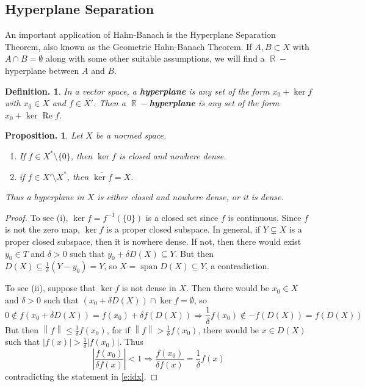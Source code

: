 \documentclass[11pt, a4paper]{memoir}
\DeclareMathOperator{\R}{{\mathbb{R}}}
\newcommand{\norm}[1]{\ensuremath{\left\lVert#1\right\rVert}}
\theoremstyle{change}
\newtheorem{proposition}[theorem]{Proposition.}
\theoremstyle{plain}
\theoremstyle{nonumberplain}
\newtheorem{definition}{Definition.}
\newtheorem{proof}{Proof}
\DeclareMathOperator{\spn}{span}
\renewcommand{\Re}{\ensuremath{\operatorname{Re}}}
\numberwithin{equation}{section}
\begin{document}
\subsection{Hyperplane Separation}
An important application of Hahn-Banach is the Hyperplane Separation Theorem, also known as the Geometric Hahn-Banach Theorem.
If $A,B\subset X$ with $A\cap B=\emptyset$ along with some other suitable assumptions, we will find a $\R-$hyperplane between $A$ and $B$.
\begin{definition}
    In a vector space, a \textbf{hyperplane} is any set of the form $x_0+\ker f$ with $x_0\in X$ and $f\in X'$.
    Then a \textbf{$\R-$hyperplane} is any set of the form $x_0+\ker\Re f$.
\end{definition}
\begin{proposition}
    Let $X$ be a normed space.
    \begin{enumerate}[nl,r]
        \item If $f\in X^*\setminus\{0\}$, then $\ker f$ is closed and nowhere dense.
        \item if $f\in X'\setminus X^*$, then $\overline{\ker f}=X$.
    \end{enumerate}
    Thus a hyperplane in $X$ is either closed and nowhere dense, or it is dense.
\end{proposition}
\begin{proof}
    To see (i), $\ker f=f^{-1}(\{0\})$ is a closed set since $f$ is continuous.
    Since $f$ is not the zero map, $\ker f$ is a proper closed subspace.
    In general, if $Y\subsetneq X$ is a proper closed subspace, then it is nowhere dense.
    If not, then there would exist $y_0\in T$ and $\delta>0$ such that $y_0+\delta D(X)\subseteq Y$.
    But then $D(X)\subseteq\frac{1}{\delta}(Y-y_0)=Y$, so $X=\spn D(X)\subseteq Y$, a contradiction.

    To see (ii), suppose that $\ker f$ is not dense in $X$.
    Then there would be $x_0\in X$ and $\delta>0$ such that $(x_0+\delta D(X))\cap \ker f=\emptyset$, so
    \begin{equation}\label{e:idx}
        0\notin f(x_0+\delta D(X))=f(x_0)+\delta f(D(X))\Longrightarrow \frac{1}{\delta}f(x_0)\notin -f(D(X))=f(D(X))
    \end{equation}
    But then $\norm{f}\leq\frac{1}{\delta}f(x_0)$, for if $\norm{f}>\frac{1}{\delta}f(x_0)$, there would be $x\in D(X)$ such that $|f(x)|>\frac{1}{\delta}|f(x_0)|$.
    Thus
    \begin{equation*}
        \left\lvert\frac{f(x_0)}{\delta f(x)}\right\rvert<1\Longrightarrow \frac{f(x_0)}{\delta f(x)}=\frac{1}{\delta}f(x)
    \end{equation*}
    contradicting the statement in \cref{e:idx}.
\end{proof}
\end{document}
